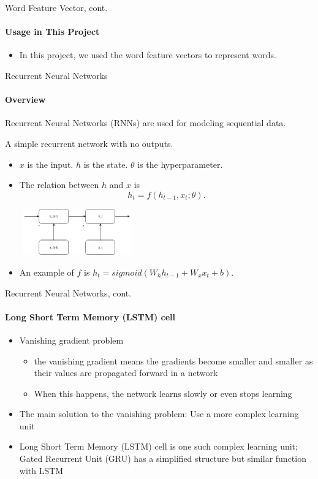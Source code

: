 \documentclass{beamer}
\begin{document}
\begin{frame}{Word Feature Vector, cont.}\framesubtitle{Usage in This Project}
   \begin{itemize}
       \item In this project, we used the word feature vectors to represent words.
   \end{itemize}

\end{frame}
\begin{frame}{Recurrent Neural Networks}\framesubtitle{Overview}

Recurrent Neural Networks (RNNs) are used for modeling sequential data.

    \begin{examples}{A simple recurrent network with no outputs.}
        \begin{itemize}
            \item $x$ is the input. $h$ is the state. $\theta$ is the hyperparameter.
            \item The relation between $h$ and $x$ is
            $$h_t = f(h_{t-1}, x_t; \theta).$$
                \begin{center}
                  \includegraphics[width=5cm, height=2cm]{figures/rnnWithNoOutputs}
                \end{center}
            \item An example of $f$ is $h_t = sigmoid(W_h h_{t-1} + W_x x_t + b).$
        \end{itemize}

    \end{examples}
\end{frame}


\begin{frame}{Recurrent Neural Networks, cont.}\framesubtitle{Long Short Term Memory (LSTM) cell}
    \begin{itemize}
        \item Vanishing gradient problem
            \begin{itemize}
                \item the vanishing gradient means the gradients become smaller and smaller as their values are propagated forward in a network
                \item When this happens, the network learns slowly or even stops learning
            \end{itemize}
        \item The main solution to the vanishing problem: Use a more complex learning unit
        \item Long Short Term Memory (LSTM) cell is one such complex learning unit; Gated Recurrent Unit (GRU) has a simplified structure but similar function with LSTM
    \end{itemize}
\end{frame}
\end{document}

